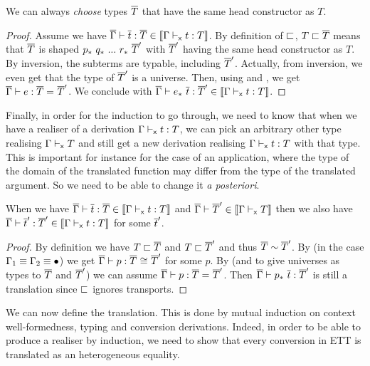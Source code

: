 \begin{lemma}
  We can always \emph{choose} types $\overline{T}$ that have the same head constructor
  as $T$.
\end{lemma}

\begin{proof}
  Assume we have $\overline{\Gamma} \vdash \overline{t} : \overline{T} \in \llbracket \Gamma \vdash_{\mathsf{x}} t : T \rrbracket$.
  By definition of $\sqsubset$,
  $T \sqsubset \overline{T}$ means that $\overline{T}$ is shaped
  $\transpo{p}\ \transpo{q}\ ...\ \transpo{r}\ \Tb'$ with $\overline{T}'$ having
  the same head constructor as $T$. By inversion, the subterms are typable,
  including $\overline{T}'$. Actually, from inversion, we even get that the type of
  $\overline{T}'$ is a universe. Then,
  using  and , we get
  $\overline{\Gamma} \vdash e : \overline{T} =_{} \overline{T}'$.
  We conclude with
  $\isterm{\Gb}{\transpo{e}\ \tb}{\Tb'} \in \transl{\xisterm{\Ga}{t}{T}}$.
\end{proof}

Finally, in order for the induction to go through, we need to know
that when we have a realiser of a derivation $\Gamma \vdash_{\mathsf{x}} t : T$, we can
pick an arbitrary other type realising $\Gamma \vdash_{\mathsf{x}} T$ and still
get a new derivation realising $\Gamma \vdash_{\mathsf{x}} t : T$ with that type.
%
This is important for instance for the case of an application, where
the type of the domain of the translated function may differ from the
type of the translated argument. So we need to be able to change it \textit{a
posteriori}.


\begin{lemma}
  When we have $\overline{\Gamma} \vdash \overline{t} : \overline{T} \in \llbracket \Gamma \vdash_{\mathsf{x}} t : T \rrbracket$
  and $\overline{\Gamma} \vdash \overline{T}' \in \llbracket \Gamma \vdash_{\mathsf{x}} T \rrbracket$ then we also have
  $\overline{\Gamma} \vdash \overline{t}' : \overline{T}' \in \llbracket \Gamma \vdash_{\mathsf{x}} t : T \rrbracket$ for some $\overline{t}'$.
\end{lemma}

\begin{proof}
  By definition we have $T \sqsubset \overline{T}$ and $T \sqsubset \overline{T}'$ and thus $\overline{T} \sim \overline{T}'$.
  By 
  (in the case $\Gamma_1 \equiv \Gamma_2 \equiv \bullet$) we get
  $\overline{\Gamma} \vdash p : \overline{T} \mathrel{{}_{}{\cong}_{}} \overline{T}'$ for some $p$.
  By  (and  to give
  universes as types to $\overline{T}$ and $\overline{T}'$) we can assume
  $\overline{\Gamma} \vdash p : \overline{T} =_{} \overline{T}'$. Then
  $\overline{\Gamma} \vdash p_*\ \overline{t} : \overline{T}'$ is still a translation since $\sqsubset$
  ignores transports.
\end{proof}

We can now define the translation. This is done by mutual induction on
context well-formedness, typing and conversion derivations. Indeed,
in order to be able to produce a realiser by induction, we need to show
that every conversion in \acrshort{ETT} is translated as an heterogeneous
equality.

